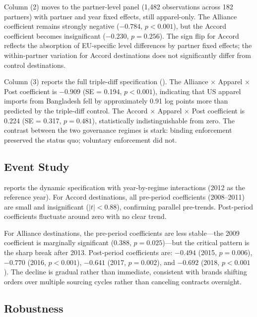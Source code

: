\documentclass[12pt]{article}
\begin{document}
Column (2) moves to the partner-level panel (1,482 observations across 182 partners) with partner and year fixed effects, still apparel-only. The Alliance coefficient remains strongly negative ($-0.784$, $p < 0.001$), but the Accord coefficient becomes insignificant ($-0.230$, $p = 0.256$). The sign flip for Accord reflects the absorption of EU-specific level differences by partner fixed effects; the within-partner variation for Accord destinations does not significantly differ from control destinations.

Column (3) reports the full triple-diff specification (). The Alliance $\times$ Apparel $\times$ Post coefficient is $-0.909$ (SE = 0.194, $p < 0.001$), indicating that US apparel imports from Bangladesh fell by approximately 0.91 log points more than predicted by the triple-diff control. The Accord $\times$ Apparel $\times$ Post coefficient is 0.224 (SE = 0.317, $p = 0.481$), statistically indistinguishable from zero. The contrast between the two governance regimes is stark: binding enforcement preserved the status quo; voluntary enforcement did not.



\subsection{Event Study}

 reports the dynamic specification with year-by-regime interactions (2012 as the reference year). For Accord destinations, all pre-period coefficients (2008--2011) are small and insignificant ($|t| < 0.88$), confirming parallel pre-trends. Post-period coefficients fluctuate around zero with no clear trend.

For Alliance destinations, the pre-period coefficients are less stable---the 2009 coefficient is marginally significant ($0.388$, $p = 0.025$)---but the critical pattern is the sharp break after 2013. Post-period coefficients are: $-0.494$ (2015, $p = 0.006$), $-0.770$ (2016, $p < 0.001$), $-0.641$ (2017, $p = 0.002$), and $-0.692$ (2018, $p < 0.001$). The decline is gradual rather than immediate, consistent with brands shifting orders over multiple sourcing cycles rather than canceling contracts overnight.



\subsection{Robustness}
\end{document}

